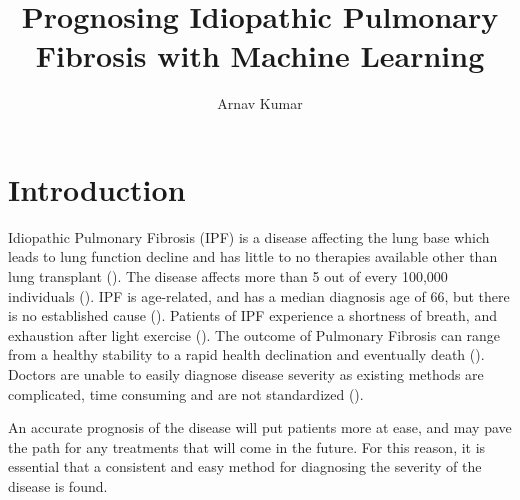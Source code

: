 \documentclass[12pt]{article}
\title{Prognosing Idiopathic Pulmonary Fibrosis with Machine Learning}
\author{Arnav Kumar}
\renewcommand{\maketitle}{
    \begin{center}
        {\large \thetitle}

        \vspace{0.1em}
        {\theauthor}
    \end{center}
}
\begin{document}
\maketitle
\thispagestyle{fancy}

\section{Introduction}


Idiopathic Pulmonary Fibrosis (IPF) is a disease affecting the lung base which leads to lung function decline and has little to no therapies available other than lung transplant (\cite{mason1999pharmacological,gross2001idiopathic}). 
The disease affects more than 5 out of every 100,000 individuals (\cite{coultas1994epidemiology,mason1999pharmacological,raghu2018diagnosis}). 
IPF is age-related, and has a median diagnosis age of 66, but there is no established cause (\cite{king2011idiopathic,raghu2018diagnosis}).
Patients of IPF experience a shortness of breath, and exhaustion after light exercise (\cite{gross2001idiopathic}).
The outcome of Pulmonary Fibrosis can range from a healthy stability to a rapid health declination and eventually death (\cite{robbie2017evaluating}). 
Doctors are unable to easily diagnose disease severity as existing methods are complicated, time consuming and are not standardized (\cite{robbie2017evaluating}). 

An accurate prognosis of the disease will put patients more at ease, and may pave the path for any treatments that will come in the future. 
For this reason, it is essential that a consistent and easy method for diagnosing the severity of the disease is found.

\end{document}
